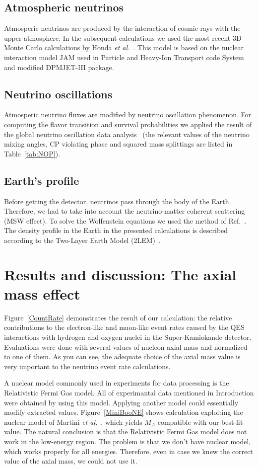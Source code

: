 \documentclass[review]{elsarticle}
\begin{document}
\subsection{Atmospheric neutrinos}
Atmosperic neutrinos are produced by the interaction of cosmic rays with the upper atmosphere. In the subsequent calculations we used the most recent 3D Monte Carlo calculations by Honda \textit{et al.}~\cite{Honda:2011nf}. This model is based on the nuclear interaction model JAM used in Particle and Heavy-Ion Transport code System and modified DPMJET-III package.
\subsection{Neutrino oscillations}
Atmosperic neutrino fluxes are modified by neutrino oscillation phenomenon. For computing the flavor transition and survival probabilities we applied the result of the global neutrino oscillation data analysis~\cite{Tortola:2012te} (the relevant values of the neutrino mixing angles, CP violating phase and squared mass splittings are listed in Table~\ref{tab:NOP}).
\subsection{Earth's profile}
Before getting the detector, neutrinos pass through the body of the Earth. Therefore, we had to take into account the neutrino-matter coherent scattering (MSW effect). To solve the Wolfenstein equations we used the method of Ref.~\cite{Naumov:1991ju,Naumov:1991rh}. The density profile in the Earth in the presented calculations is described according to the Two-Layer Earth Model (2LEM)~\cite{Agarwalla:2012uj}.

\section{Results and discussion: The axial mass effect}
Figure~\ref{CountRate} demonstrates the result of our calculation: the relative contributions to the electron-like and muon-like event rates caused by the QES interactions with hydrogen and oxygen nuclei in the Super-Kamiokande detector. Evaluations were done with several values of nucleon axial mass and normalized to one of them. As you can see, the adequate choice of the axial mass value is very important to the neutrino event rate calculations.

A nuclear model commonly used in experiments for data processing is the Relativistic Fermi Gas model. All of experimantal data mentioned in Introduction were obtained by using this model. Applying another model could essentially modify extracted values. Figure~\ref{MiniBooNE} shows calculation exploiting the nuclear model of Martini \textit{et al.}~\cite{Martini:2011wp}, which yields $M_A$ compatible with our best-fit value. The natural conclusion is that the Relativistic Fermi Gas model does not work in the low-energy region. The problem is that we don't have nuclear model, which works properly for all energies. Therefore, even in case we knew the correct value of the axial mass, we could not use it.
\end{document}

